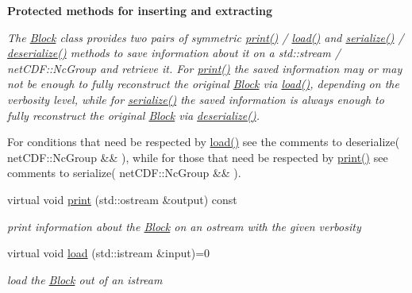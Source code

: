 \begin{Indent}\textbf{ Protected methods for inserting and extracting}\par
{\em The \mbox{\hyperlink{class_s_m_spp__di__unipi__it_1_1_block}{Block}} class provides two pairs of symmetric \mbox{\hyperlink{class_s_m_spp__di__unipi__it_1_1_block_a2e7b9c9148a98c5c342e8c25cac95926}{print()}} / \mbox{\hyperlink{class_s_m_spp__di__unipi__it_1_1_block_a27ae9e4279482d52342c7958c34a43c6}{load()}} and \mbox{\hyperlink{class_s_m_spp__di__unipi__it_1_1_block_a8209df4072912666c1ea5f6979c035fc}{serialize()}} / \mbox{\hyperlink{class_s_m_spp__di__unipi__it_1_1_block_a4210de3b3b076cf4273eaee2b916da84}{deserialize()}} methods to save information about it on a std\+::stream / net\+C\+D\+F\+::\+Nc\+Group and retrieve it. For \mbox{\hyperlink{class_s_m_spp__di__unipi__it_1_1_block_a2e7b9c9148a98c5c342e8c25cac95926}{print()}} the saved information may or may not be enough to fully reconstruct the original \mbox{\hyperlink{class_s_m_spp__di__unipi__it_1_1_block}{Block}} via \mbox{\hyperlink{class_s_m_spp__di__unipi__it_1_1_block_a27ae9e4279482d52342c7958c34a43c6}{load()}}, depending on the verbosity level, while for \mbox{\hyperlink{class_s_m_spp__di__unipi__it_1_1_block_a8209df4072912666c1ea5f6979c035fc}{serialize()}} the saved information is always enough to fully reconstruct the original \mbox{\hyperlink{class_s_m_spp__di__unipi__it_1_1_block}{Block}} via \mbox{\hyperlink{class_s_m_spp__di__unipi__it_1_1_block_a4210de3b3b076cf4273eaee2b916da84}{deserialize()}}.

For conditions that need be respected by \mbox{\hyperlink{class_s_m_spp__di__unipi__it_1_1_block_a27ae9e4279482d52342c7958c34a43c6}{load()}} see the comments to deserialize( net\+C\+D\+F\+::\+Nc\+Group \&\& ), while for those that need be respected by \mbox{\hyperlink{class_s_m_spp__di__unipi__it_1_1_block_a2e7b9c9148a98c5c342e8c25cac95926}{print()}} see comments to serialize( net\+C\+D\+F\+::\+Nc\+Group \&\& ). }\begin{DoxyCompactItemize}
\item 
virtual void \mbox{\hyperlink{class_s_m_spp__di__unipi__it_1_1_block_a2e7b9c9148a98c5c342e8c25cac95926}{print}} (std\+::ostream \&output) const
\begin{DoxyCompactList}\small\item\em print information about the \mbox{\hyperlink{class_s_m_spp__di__unipi__it_1_1_block}{Block}} on an ostream with the given verbosity \end{DoxyCompactList}\item 
virtual void \mbox{\hyperlink{class_s_m_spp__di__unipi__it_1_1_block_a27ae9e4279482d52342c7958c34a43c6}{load}} (std\+::istream \&input)=0
\begin{DoxyCompactList}\small\item\em load the \mbox{\hyperlink{class_s_m_spp__di__unipi__it_1_1_block}{Block}} out of an istream \end{DoxyCompactList}\end{DoxyCompactItemize}
\end{Indent}

